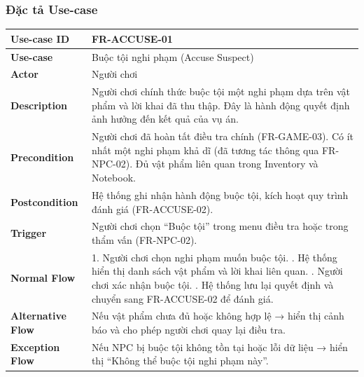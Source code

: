 \subsubsection{Đặc tả Use-case}

\begin{table}[H]
\centering
\begin{tabular}{|p{4cm}|p{10cm}|}
\hline
\textbf{Use-case ID} & FR-ACCUSE-01 \\ \hline
\textbf{Use-case} & Buộc tội nghi phạm (Accuse Suspect) \\ \hline
\textbf{Actor} & Người chơi \\ \hline
\textbf{Description} & Người chơi chính thức buộc tội một nghi phạm dựa trên vật phẩm và lời khai đã thu thập. Đây là hành động quyết định ảnh hưởng đến kết quả của vụ án. \\ \hline
\textbf{Precondition} & 
Người chơi đã hoàn tất điều tra chính (FR-GAME-03). \newline
Có ít nhất một nghi phạm khả dĩ (đã tương tác thông qua FR-NPC-02). \newline
Đủ vật phẩm liên quan trong Inventory và Notebook.\\ \hline
\textbf{Postcondition} & 
Hệ thống ghi nhận hành động buộc tội, kích hoạt quy trình đánh giá (FR-ACCUSE-02). \\ \hline
\textbf{Trigger} & Người chơi chọn “Buộc tội” trong menu điều tra hoặc trong thẩm vấn (FR-NPC-02). \\ \hline
\textbf{Normal Flow} &
1. Người chơi chọn nghi phạm muốn buộc tội. \newline
2. Hệ thống hiển thị danh sách vật phẩm và lời khai liên quan. \newline
3. Người chơi xác nhận buộc tội. \newline
4. Hệ thống lưu lại quyết định và chuyển sang FR-ACCUSE-02 để đánh giá. \\ \hline
\textbf{Alternative Flow} &
Nếu vật phẩm chưa đủ hoặc không hợp lệ → hiển thị cảnh báo và cho phép người chơi quay lại điều tra. \\ \hline
\textbf{Exception Flow} &
Nếu NPC bị buộc tội không tồn tại hoặc lỗi dữ liệu → hiển thị “Không thể buộc tội nghi phạm này”. \\ \hline
\end{tabular}
\end{table}

